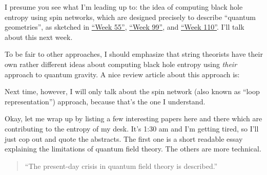 \documentclass{article}
\def\tightlist{}
\renewcommand{\texttt}[1]{%
  \begingroup
  \ttfamily
  \begingroup\lccode`~=`/\lowercase{\endgroup\def~}{/\discretionary{}{}{}}%
  \begingroup\lccode`~=`[\lowercase{\endgroup\def~}{[\discretionary{}{}{}}%
  \begingroup\lccode`~=`.\lowercase{\endgroup\def~}{.\discretionary{}{}{}}%
  \catcode`/=\active\catcode`[=\active\catcode`.=\active
  \scantokens{#1\noexpand}%
  \endgroup
}
\begin{document}
I presume you see what I'm leading up to: the idea of computing black
hole entropy using spin networks, which are designed precisely to
describe ``quantum geometries'', as sketched in
\protect\hyperlink{week55}{``Week 55''},
\protect\hyperlink{week99}{``Week 99''}, and
\protect\hyperlink{week110}{``Week 110''}. I'll talk about this next
week.

To be fair to other approaches, I should emphasize that string theorists
have their own rather different ideas about computing black hole entropy
using \emph{their} approach to quantum gravity. A nice review article
about this approach is:


Next time, however, I will only talk about the spin network (also known
as ``loop representation'') approach, because that's the one I
understand.

Okay, let me wrap up by listing a few interesting papers here and there
which are contributing to the entropy of my desk. It's 1:30 am and I'm
getting tired, so I'll just cop out and quote the abstracts. The first
one is a short readable essay explaining the limitations of quantum
field theory. The others are more technical.


\begin{quote}
``The present-day crisis in quantum field theory is described.''
\end{quote}

\end{document}
